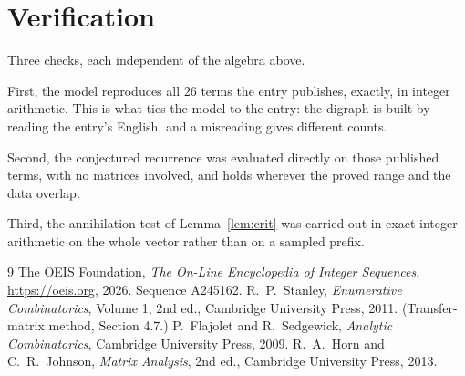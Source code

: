 \documentclass[11pt,a4paper]{article}
\theoremstyle{plain}
\theoremstyle{definition}
\begin{document}
\section{Verification}

Three checks, each independent of the algebra above.

First, the model reproduces all $26$ terms the entry publishes, exactly, in integer
arithmetic. This is what ties the model to the entry: the digraph is built by reading the
entry's English, and a misreading gives different counts.

Second, the conjectured recurrence was evaluated directly on those published terms, with no
matrices involved, and holds wherever the proved range and the data overlap.

Third, the annihilation test of Lemma~\ref{lem:crit} was carried out in exact integer
arithmetic on the whole vector rather than on a sampled prefix.

\begin{thebibliography}{9}
 The OEIS Foundation, \emph{The On-Line Encyclopedia of Integer
Sequences}, \url{https://oeis.org}, 2026. Sequence A245162.
 R.~P.~Stanley, \emph{Enumerative Combinatorics}, Volume 1, 2nd ed.,
Cambridge University Press, 2011. (Transfer-matrix method, Section 4.7.)
 P.~Flajolet and R.~Sedgewick, \emph{Analytic Combinatorics}, Cambridge
University Press, 2009.
 R.~A.~Horn and C.~R.~Johnson, \emph{Matrix Analysis}, 2nd ed., Cambridge
University Press, 2013.
\end{thebibliography}
\end{document}
